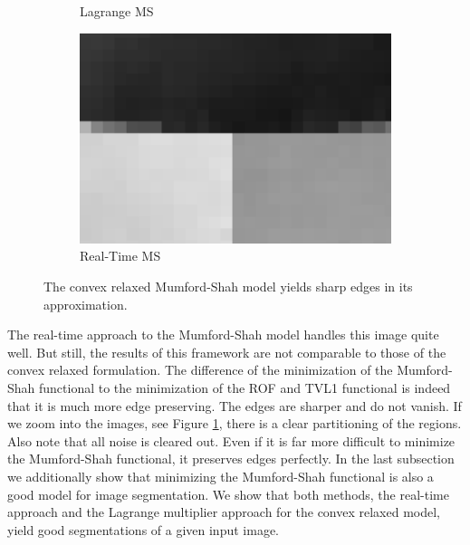 \documentclass[abstracton]{scrreprt}
\begin{document}
\begin{figure}[!ht]
\begin{subfigure}[b]{0.29\textwidth}
                    \caption{Lagrange MS}
                \end{subfigure}
                \begin{subfigure}[b]{0.29\textwidth}
                    \includegraphics[width=\textwidth]{img/zoomed/gauss_noise_rt_zoomed.png}
                    \caption{Real-Time MS}
                \end{subfigure}
                \caption[Gauss denoising comparison of several models with zooming into images.]{The convex relaxed Mumford-Shah model yields sharp edges in its approximation.}
            \label{fig:synth_gauss_compare_zoomed}
            \end{figure}

            The real-time approach to the Mumford-Shah model handles this image quite well. But still, the results of this framework are not comparable to those of the convex relaxed formulation. The difference of the minimization of the Mumford-Shah functional to the minimization of the ROF and TVL1 functional is indeed that it is much more edge preserving. The edges are sharper and do not vanish. If we zoom into the images, see Figure \ref{fig:synth_gauss_compare_zoomed}, there is a clear partitioning of the regions. Also note that all noise is cleared out. Even if it is far more difficult to minimize the Mumford-Shah functional, it preserves edges perfectly. In the last subsection we additionally show that minimizing the Mumford-Shah functional is also a good model for image segmentation. We show that both methods, the real-time approach and the Lagrange multiplier approach for the convex relaxed model, yield good segmentations of a given input image.
\end{document}
